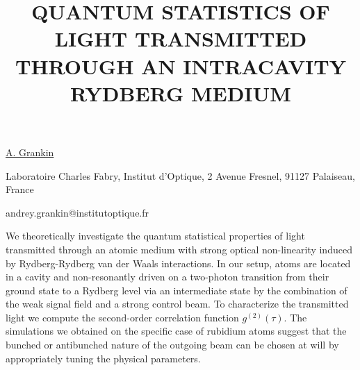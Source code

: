 \title{QUANTUM STATISTICS OF LIGHT TRANSMITTED THROUGH AN INTRACAVITY RYDBERG MEDIUM}

\underline{A. Grankin} 

{\normalsize{\vspace{-4mm}
Laboratoire Charles Fabry, Institut d'Optique, 2 Avenue Fresnel, 91127 Palaiseau, France

\email andrey.grankin@institutoptique.fr}}

We theoretically investigate the quantum statistical properties of light transmitted through an
atomic medium with strong optical non-linearity induced by Rydberg-Rydberg van der Waals
interactions. In our setup, atoms are located in a cavity and non-resonantly driven on a two-photon
transition from their ground state to a Rydberg level via an intermediate state by the combination of
the weak signal field and a strong control beam. To characterize the transmitted light we
compute the second-order correlation function $g^{\left(2\right)}\left(\tau\right)$. The simulations
we obtained on the specific case of rubidium atoms suggest that the bunched or antibunched nature of
the outgoing beam can be chosen at will by appropriately tuning the physical parameters.

\vspace{\baselineskip}
